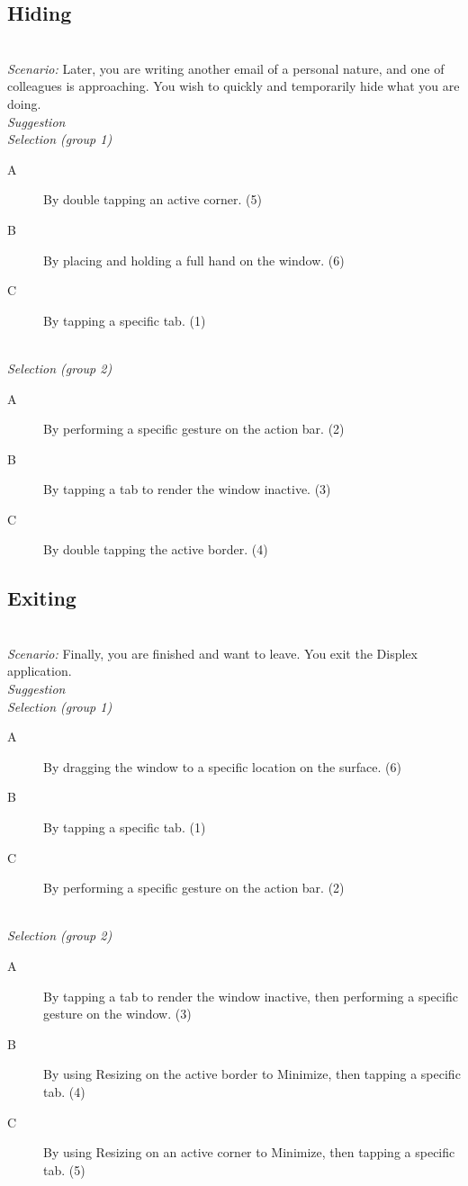 
\subsection{Hiding}
\hfill\\
\emph{Scenario:}
Later, you are writing another email of a personal nature, and one of colleagues is approaching. You wish to quickly and temporarily hide what you are doing.
\hfill\\
\emph{Suggestion}
\hfill\\
\emph{Selection (group 1)}
\begin{description}
\item[A]{By double tapping an active corner. (5)}
\item[B]{By placing and holding a full hand on the window. (6)}
\item[C]{By tapping a specific tab. (1)}
\end{description}
\hfill\\
\emph{Selection (group 2)}
\begin{description}
\item[A]{By performing a specific gesture on the action bar. (2)}
\item[B]{By tapping a tab to render the window inactive. (3)}
\item[C]{By double tapping the active border. (4)}
\end{description}



\subsection{Exiting}
\hfill\\
\emph{Scenario:}
Finally, you are finished and want to leave. You exit the Displex application.
\hfill\\
\emph{Suggestion}
\hfill\\
\emph{Selection (group 1)}
\begin{description}
\item[A]{By dragging the window to a specific location on the surface. (6)}
\item[B]{By tapping a specific tab. (1)}
\item[C]{By performing a specific gesture on the action bar. (2)}
\end{description}
\hfill\\
\emph{Selection (group 2)}
\begin{description}
\item[A]{By tapping a tab to render the window inactive, then performing a specific gesture on the window. (3)}
\item[B]{By using Resizing on the active border to Minimize, then tapping a specific tab. (4)}
\item[C]{By using Resizing on an active corner to Minimize, then tapping a specific tab. (5)}
\end{description}


